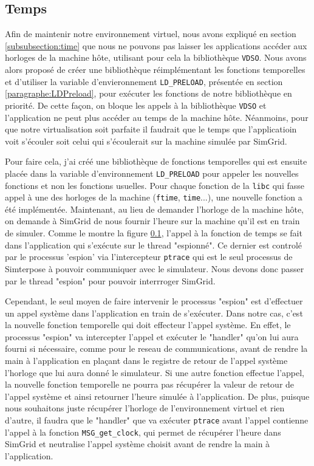 \subsection{Temps}
Afin de maintenir notre environnement virtuel, nous avons expliqué en section \ref{subsubsection:time} que nous ne pouvons pas laisser les applications accéder aux horloges de la machine hôte, utilisant pour cela la bibliothèque \texttt{VDSO}. Nous avons alors proposé de créer une bibliothèque réimplémentant les fonctions temporelles et d'utiliser la variable d'envieronnement \texttt{LD\_PRELOAD}, présentée en section \ref{paragraphe:LDPreload}, pour exécuter les fonctions de notre bibliothèque en priorité. De cette façon, on bloque les appels à la bibliothèque \texttt{VDSO} et l'application ne peut plus accéder au temps de la machine hôte. Néanmoins, pour que notre virtualisation soit parfaite il faudrait que le temps que l'applicatioin voit s'écouler soit celui qui s'écoulerait sur la machine simulée par SimGrid. 

Pour faire cela, j'ai créé une bibliothèque de fonctions temporelles qui est ensuite placée dans la variable d'environnement \texttt{LD\_PRELOAD} pour appeler les nouvelles fonctions et non les fonctions usuelles. Pour chaque fonction de la \texttt{libc} qui fasse appel à une des horloges de la machine (\texttt{ftime}, \texttt{time}...), une nouvelle fonction a été implémentée. Maintenant, au lieu de demander l'horloge de la machine hôte, on demande à SimGrid de nous fournir l'heure sur la machine qu'il est en train de simuler. Comme le montre la figure \ref{}, l'appel à la fonction de temps se fait dans l'application qui s'exécute sur le thread "espionné". Ce dernier est controlé par le processus 'espion' via l'intercepteur \texttt{ptrace} qui est le seul processus de Simterpose à pouvoir communiquer avec le simulateur. Nous devons donc passer par le thread "espion" pour pouvoir interrroger SimGrid. 

Cependant, le seul moyen de faire intervenir le processus "espion" est d'effectuer un appel système dans l'application en train de s'exécuter. Dans notre cas, c'est la nouvelle fonction temporelle qui doit effecteur l'appel système. En effet, le processus "espion" va intercepter l'appel et exécuter le "handler" qu'on lui aura fourni si nécessaire, comme pour le reseau de communications, avant de rendre la main à l'application en plaçant dans le registre de retour de l'appel système l'horloge que lui aura donné le simulateur. Si une autre fonction effectue l'appel, la nouvelle fonction temporelle ne pourra pas récupérer la valeur de retour de l'appel système et ainsi retourner l'heure simulée à l'application. De plus, puisque nous souhaitons juste récupérer l'horloge de l'environnement virtuel et rien d'autre, il faudra que le "handler" que va exécuter \texttt{ptrace} avant l'appel contienne l'appel à la fonction \texttt{MSG\_get\_clock}, qui permet de récupérer l'heure dans SimGrid et neutralise l'appel système choisit avant de rendre la main à l'application. 

